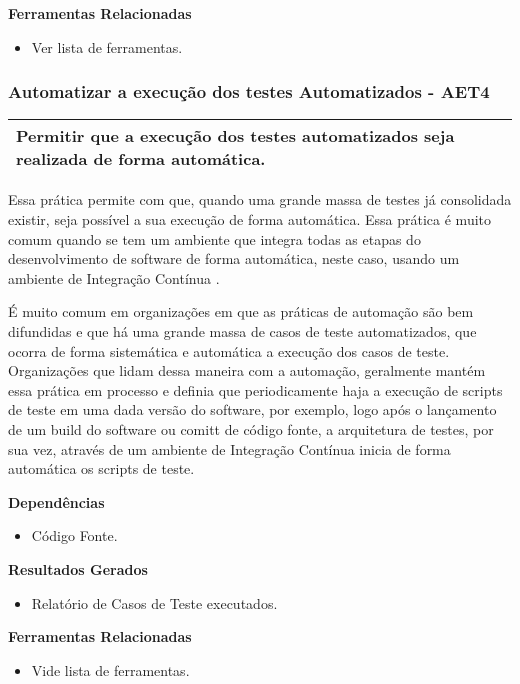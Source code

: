 \textbf{Ferramentas Relacionadas}
\begin{itemize}
    \item Ver lista de ferramentas.
\end{itemize}

\subsubsection{Automatizar a execução dos testes Automatizados - AET4}
\label{sec:aet4}

\begin{table}[!ht]
\centering
\begin{tabular}{|p{130mm}|}
\hline
Permitir que a execução dos testes automatizados seja realizada de forma automática. \\ 
\hline
\end{tabular}
\end{table}

Essa prática permite com que, quando uma grande massa de testes já consolidada existir, seja possível a sua execução de forma automática. Essa prática é muito comum quando se tem um ambiente que integra todas as etapas do desenvolvimento de software de forma automática, neste caso, usando um ambiente de Integração Contínua \cite{BRAGA2015}.

É muito comum em organizações em que as práticas de automação são bem difundidas e que há uma grande massa de casos de teste automatizados, que ocorra de forma sistemática e automática a execução dos casos de teste. Organizações que lidam dessa maneira com a automação, geralmente mantém essa prática em processo e definia que periodicamente haja a execução de scripts de teste em uma dada versão do software, por exemplo, logo após o lançamento de um build do software ou comitt de código fonte, a arquitetura de testes, por sua vez, através de um ambiente de Integração Contínua inicia de forma automática os scripts de teste.

\textbf{Dependências}
\begin{itemize}
    \item Código Fonte.
\end{itemize}

\textbf{Resultados Gerados }
\begin{itemize}
    \item Relatório de Casos de Teste executados.
\end{itemize}

\textbf{Ferramentas Relacionadas }
\begin{itemize}
    \item Vide lista de ferramentas.
\end{itemize}


